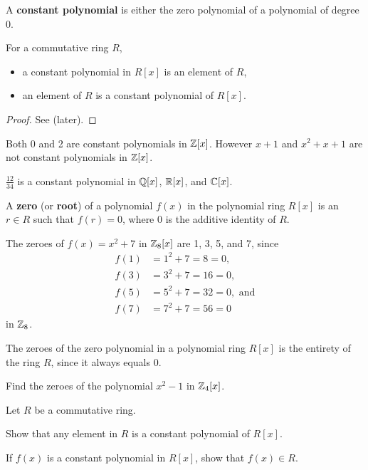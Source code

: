 \begin{definition}
    A \textbf{constant polynomial} is either the zero polynomial of a polynomial of degree 0.
\end{definition}
\begin{proposition}
    For a commutative ring $R$,
    \begin{itemize}
        \item a constant polynomial in $R[x]$ is an element of $R$,
        \item an element of $R$ is a constant polynomial of $R[x]$.
    \end{itemize}
\end{proposition}
\begin{proof}
    See  (later).
\end{proof}
\begin{example}
    Both 0 and 2 are constant polynomials in $\mathbb{Z}[x]$. However $x + 1$ and $x^2 + x + 1$ are not constant polynomials in $\mathbb{Z}[x]$.
\end{example}
\begin{example}
    $\frac{12}{34}$ is a constant polynomial in $\mathbb{Q}[x]$, $\mathbb{R}[x]$, and $\mathbb{C}[x]$.
\end{example}

\begin{definition}
    A \textbf{zero} (or \textbf{root}) of a polynomial $f(x)$ in the polynomial ring $R[x]$ is an $r \in R$ such that $f(r) = 0$, where 0 is the additive identity of $R$.
\end{definition}
\begin{example}
    The zeroes of $f(x) = x^2+7$ in $\mathbb{Z}_8[x]$ are 1, 3, 5, and 7, since
    \begin{align*}
        f(1) &= 1^2 + 7 = 8 = 0,\\
        f(3) &= 3^2 + 7 = 16 = 0,\\
        f(5) &= 5^2 + 7 = 32 = 0, \text{ and}\\
        f(7) &= 7^2 + 7 = 56 = 0
    \end{align*}
    in $\mathbb{Z}_8$.
\end{example}
\begin{example}
    The zeroes of the zero polynomial in a polynomial ring $R[x]$ is the entirety of the ring $R$, since it always equals 0.
\end{example}

\begin{exercise}
    Find the zeroes of the polynomial $x^2-1$ in $\mathbb{Z}_4[x]$.
\end{exercise}
\begin{exercise}\label{exercise-constant-polynomial-iff-ring-element}
    Let $R$ be a commutative ring.
    \begin{partquestions}{\alph*}
        \item Show that any element in $R$ is a constant polynomial of $R[x]$.
        \item If $f(x)$ is a constant polynomial in $R[x]$, show that $f(x) \in R$.
    \end{partquestions}
\end{exercise}


